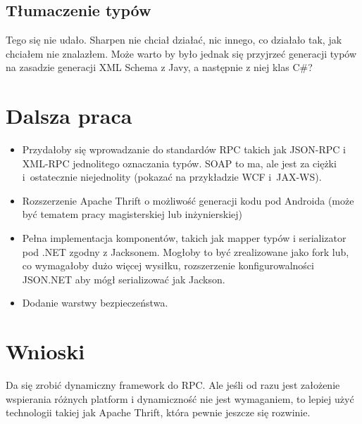 \subsection{Tłumaczenie typów}
Tego się nie udało. Sharpen nie chciał działać, nic innego, co działało tak, jak chciałem nie znalazłem. Może warto by było jednak się przyjrzeć generacji typów na zasadzie generacji XML Schema z Javy, a następnie z niej klas C\#?



\section{Dalsza praca}
\begin{itemize}
	\item Przydałoby się wprowadzanie do standardów RPC takich jak JSON-RPC i XML-RPC jednolitego oznaczania typów. SOAP to ma, ale jest za ciężki i~ostatecznie niejednolity (pokazać na przykładzie WCF i~JAX-WS).
	\item Rozszerzenie Apache Thrift o możliwość generacji kodu pod Androida (może być tematem pracy magisterskiej lub inżynierskiej)
	\item Pełna implementacja komponentów, takich jak mapper typów i serializator pod .NET zgodny z Jacksonem. Mogłoby to być zrealizowane jako fork lub, co wymagałoby dużo więcej wysiłku, rozszerzenie konfigurowalności JSON.NET aby mógł serializować jak Jackson.
	\item Dodanie warstwy bezpieczeństwa.
\end{itemize}




\section{Wnioski}
Da się zrobić dynamiczny framework do RPC. Ale jeśli od razu jest założenie wspierania różnych platform i dynamiczność nie jest wymaganiem, to lepiej użyć technologii takiej jak Apache Thrift, która pewnie jeszcze się rozwinie.